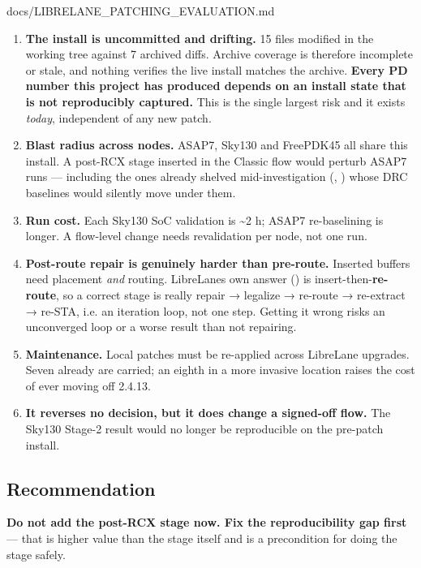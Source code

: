 \begin{relocated}{docs/LIBRELANE_PATCHING_EVALUATION.md}
\begin{enumerate}
\def\labelenumi{\arabic{enumi}.}
\tightlist
\item
  \textbf{The install is uncommitted and drifting.} 15 files modified in
  the working tree against 7 archived diffs. Archive coverage is
  therefore incomplete or stale, and nothing verifies the live install
  matches the archive. \textbf{Every PD number this project has produced
  depends on an install state that is not reproducibly captured.} This
  is the single largest risk and it exists \emph{today}, independent of
  any new patch.
\item
  \textbf{Blast radius across nodes.} ASAP7, Sky130 and FreePDK45 all
  share this install. A post-RCX stage inserted in the Classic flow
  would perturb ASAP7 runs --- including the ones already shelved
  mid-investigation (, ) whose DRC baselines would
  silently move under them.
\item
  \textbf{Run cost.} Each Sky130 SoC validation is \textasciitilde2 h;
  ASAP7 re-baselining is longer. A flow-level change needs revalidation
  per node, not one run.
\item
  \textbf{Post-route repair is genuinely harder than pre-route.}
  Inserted buffers need placement \emph{and} routing.
  LibreLane\textquotesingle s own answer () is
  insert-then-\textbf{re-route}, so a correct stage is really repair →
  legalize → re-route → re-extract → re-STA, i.e. an iteration loop, not
  one step. Getting it wrong risks an unconverged loop or a worse result
  than not repairing.
\item
  \textbf{Maintenance.} Local patches must be re-applied across
  LibreLane upgrades. Seven already are carried; an eighth in a more
  invasive location raises the cost of ever moving off 2.4.13.
\item
  \textbf{It reverses no decision, but it does change a signed-off
  flow.} The Sky130 Stage-2 result would no longer be reproducible on
  the pre-patch install.
\end{enumerate}

\subsection{Recommendation}\label{tm:pd:librelane-patching:recommendation}

\textbf{Do not add the post-RCX stage now. Fix the reproducibility gap
first} --- that is higher value than the stage itself and is a
precondition for doing the stage safely.


\end{relocated}

